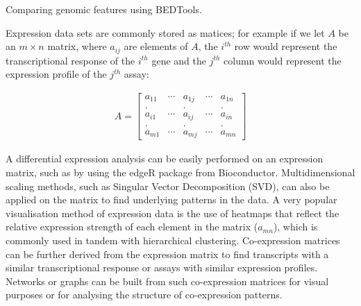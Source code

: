 Comparing genomic features using BEDTools\cite{pmid20110278}.

Expression data sets are commonly stored as matices; for example if we let $A$ be an $m \times n$ matrix, where $a_{ij}$ are elements of $A$, the $i^{th}$ row would represent the transcriptional response of the $i^{th}$ gene and the $j^{th}$ column would represent the expression profile of the $j^{th}$ assay:

\begin{align*}
   A = \begin{bmatrix} a_{11} & \cdots & a_{1j} & \cdots & a_{1n} \\
   . && . && . \\
   a_{i1} & \cdots & a_{ij} & \cdots & a_{in} \\
   . && . && . \\
   a_{m1} & \cdots & a_{mj} & \cdots & a_{mn} \end{bmatrix}
\end{align*}

A differential expression analysis can be easily performed on an expression matrix, such as by using the edgeR package\cite{pmid19910308} from Bioconductor\cite{pmid15461798}. Multidimensional scaling methods, such as Singular Vector Decomposition (SVD), can also be applied on the matrix to find underlying patterns in the data. A very popular visualisation method of expression data is the use of heatmaps that reflect the relative expression strength of each element in the matrix ($a_{mn}$), which is commonly used in tandem with hierarchical clustering. Co-expression matrices can be further derived from the expression matrix to find transcripts with a similar transcriptional response or assays with similar expression profiles. Networks or graphs can be built from such co-expression matrices for visual purposes or for analysing the structure of co-expression patterns.

